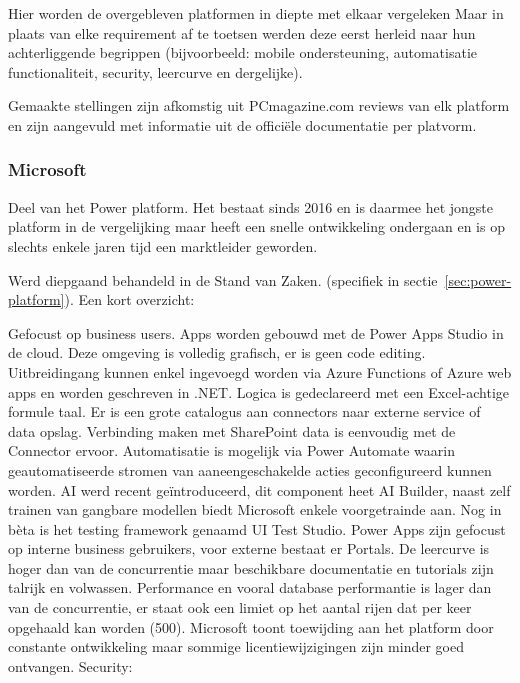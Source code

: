 
Hier worden de overgebleven platformen in diepte met elkaar vergeleken Maar in plaats van elke requirement af te toetsen werden deze eerst herleid naar hun achterliggende begrippen (bijvoorbeeld: mobile ondersteuning, automatisatie functionaliteit, security, leercurve en dergelijke).

Gemaakte stellingen zijn afkomstig uit PCmagazine.com reviews van elk platform en zijn aangevuld met informatie uit de officiële documentatie per platvorm.

\subsubsection{Microsoft}

Deel van het Power platform. Het bestaat sinds 2016 en is daarmee het jongste platform in de vergelijking maar heeft een snelle ontwikkeling ondergaan en is op slechts enkele jaren tijd een marktleider geworden.

Werd diepgaand behandeld in de Stand van Zaken. (specifiek in sectie~\ref{sec:power-platform}). Een kort overzicht:

Gefocust op business users.
Apps worden gebouwd met de Power Apps Studio in de cloud. Deze omgeving is volledig grafisch, er is geen code editing. Uitbreidingang kunnen enkel ingevoegd worden via Azure Functions of Azure web apps en worden geschreven in .NET. Logica is gedeclareerd met een Excel-achtige formule taal. Er is een grote catalogus aan connectors naar externe service of data opslag. Verbinding maken met SharePoint data is eenvoudig met de Connector ervoor. Automatisatie is mogelijk via Power Automate waarin geautomatiseerde stromen van aaneengeschakelde acties geconfigureerd kunnen worden. AI werd recent geïntroduceerd, dit component heet AI Builder, naast zelf trainen van gangbare modellen biedt Microsoft enkele voorgetrainde aan. Nog in bèta is het testing framework genaamd UI Test Studio. Power Apps zijn gefocust op interne business gebruikers, voor externe bestaat er Portals. De leercurve is hoger dan van de concurrentie maar beschikbare documentatie en tutorials zijn talrijk en volwassen. Performance en vooral database performantie is lager dan van de concurrentie, er staat ook een limiet op het aantal rijen dat per keer opgehaald kan worden (500). Microsoft toont toewijding aan het platform door constante ontwikkeling maar sommige licentiewijzigingen zijn minder goed ontvangen.
Security: %


